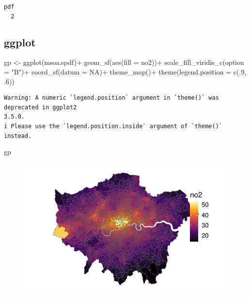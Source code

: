 \documentclass[
  letterpaper,
]{scrbook}
\newenvironment{Shaded}{\begin{snugshade}}{\end{snugshade}}
\newcommand{\AttributeTok}[1]{\textcolor[rgb]{0.40,0.45,0.13}{#1}}
\newcommand{\ConstantTok}[1]{\textcolor[rgb]{0.56,0.35,0.01}{#1}}
\newcommand{\DecValTok}[1]{\textcolor[rgb]{0.68,0.00,0.00}{#1}}
\newcommand{\FunctionTok}[1]{\textcolor[rgb]{0.28,0.35,0.67}{#1}}
\newcommand{\NormalTok}[1]{\textcolor[rgb]{0.00,0.23,0.31}{#1}}
\newcommand{\OtherTok}[1]{\textcolor[rgb]{0.00,0.23,0.31}{#1}}
\newcommand{\SpecialCharTok}[1]{\textcolor[rgb]{0.37,0.37,0.37}{#1}}
\newcommand{\StringTok}[1]{\textcolor[rgb]{0.13,0.47,0.30}{#1}}
\begin{document}
\begin{verbatim}
pdf 
  2 
\end{verbatim}

\hypertarget{ggplot}{%
\subsection{ggplot}\label{ggplot}}

\begin{Shaded}
\begin{Highlighting}[]
\NormalTok{gp }\OtherTok{\textless{}{-}} \FunctionTok{ggplot}\NormalTok{(msoa.spdf)}\SpecialCharTok{+}
    \FunctionTok{geom\_sf}\NormalTok{(}\FunctionTok{aes}\NormalTok{(}\AttributeTok{fill =}\NormalTok{ no2))}\SpecialCharTok{+}
    \FunctionTok{scale\_fill\_viridis\_c}\NormalTok{(}\AttributeTok{option =} \StringTok{"B"}\NormalTok{)}\SpecialCharTok{+}
    \FunctionTok{coord\_sf}\NormalTok{(}\AttributeTok{datum =} \ConstantTok{NA}\NormalTok{)}\SpecialCharTok{+}
    \FunctionTok{theme\_map}\NormalTok{()}\SpecialCharTok{+}
    \FunctionTok{theme}\NormalTok{(}\AttributeTok{legend.position =} \FunctionTok{c}\NormalTok{(.}\DecValTok{9}\NormalTok{, .}\DecValTok{6}\NormalTok{))}
\end{Highlighting}
\end{Shaded}

\begin{verbatim}
Warning: A numeric `legend.position` argument in `theme()` was deprecated in ggplot2
3.5.0.
i Please use the `legend.position.inside` argument of `theme()` instead.
\end{verbatim}

\begin{Shaded}
\begin{Highlighting}[]
\NormalTok{gp}
\end{Highlighting}
\end{Shaded}

\begin{figure}[H]

{\centering \includegraphics{02_spatial-data_files/figure-pdf/unnamed-chunk-22-1.pdf}

}

\end{figure}
\end{document}
